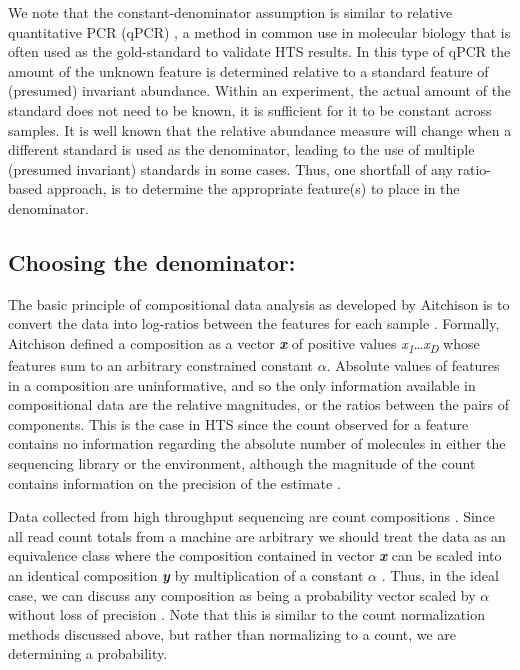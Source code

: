 \documentclass[graybox]{svmult}
\begin{document}
We note that the constant-denominator assumption is  similar to relative quantitative PCR (qPCR) \cite{Thellin:1999aa,Vandesompele:2002aa}, a method in common use in molecular biology that is often used as the gold-standard to validate HTS results. In this type of qPCR the amount of the unknown feature is determined relative to a standard feature of (presumed) invariant abundance. Within an experiment, the actual amount of the standard does not need to be known, it is sufficient for it to be constant across samples. It is well known that the relative abundance measure will change when a different standard is used as the denominator, leading to the use of multiple (presumed invariant) standards in some cases. Thus, one shortfall of any ratio-based approach, is to determine the appropriate feature(s) to place in the denominator. 

\subsection*{Choosing the denominator:}
\label{subsec1:2}

The basic principle of compositional data analysis as developed by Aitchison is to convert the data into log-ratios between the features for each sample \cite{Aitchison:1986}. Formally, Aitchison defined a composition as a vector \textit{\textbf{x}}  of positive values \textit{x\textsubscript{1}}\ldots\textit{x\textsubscript{D}} whose features  sum to an arbitrary constrained constant $\alpha$. Absolute values of features in a composition are uninformative, and so the only information available in compositional data are the relative magnitudes, or the ratios between the pairs of components. This is the case in HTS since the count observed for a feature contains no information regarding the absolute number of molecules in either the sequencing library or the environment, although the magnitude of the count contains information on the precision of the estimate \cite{gloorAJS:2016,fernandes:2013}.

Data collected from high throughput sequencing are count compositions \cite{fernandes:2014,gloorAJS:2016}. Since all read count totals from a machine are arbitrary we should treat the data as an equivalence class  where the composition contained in vector \textit{\bf{x}} can be scaled into an identical composition \textit{\textbf{y}} by multiplication of a constant $\alpha$ \cite{barcelo:2001}. Thus, in the ideal case, we can discuss any composition as being a probability vector scaled by $\alpha$ without loss of precision \cite{fernandes:2013}. Note that this is similar to the count normalization methods discussed above, but rather than normalizing to a count, we are determining a probability. 
\end{document}
